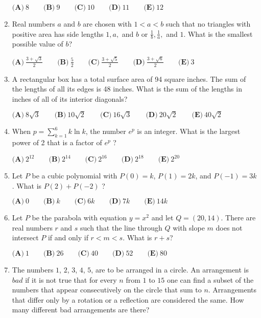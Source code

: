 \documentclass{article}
\begin{document}
\begin{enumerate}[label=\arabic*., itemsep=0.5em]
$ \textbf{(A)}\ 8\qquad\textbf{(B)}\ 9\qquad\textbf{(C)}\ 10\qquad\textbf{(D)}\ 11\qquad\textbf{(E)}\ 12 $\par \vspace{0.5em}\item Real numbers $a$ and $b$ are chosen with $1<a<b$ such that no triangles with positive area has side lengths $1, a,$ and $b$ or $\tfrac{1}{b}, \tfrac{1}{a},$ and $1$. What is the smallest possible value of $b$?

$ \textbf{(A)}\ \frac{3+\sqrt{3}}{2}\qquad\textbf{(B)}\ \frac{5}{2}\qquad\textbf{(C)}\ \frac{3+\sqrt{5}}{2}\qquad\textbf{(D)}\ \frac{3+\sqrt{6}}{2}\qquad\textbf{(E)}\ 3 $\par \vspace{0.5em}\item A rectangular box has a total surface area of 94 square inches. The sum of the lengths of all its edges is 48 inches. What is the sum of the lengths in inches of all of its interior diagonals?

$ \textbf{(A)}\ 8\sqrt{3}\qquad\textbf{(B)}\ 10\sqrt{2}\qquad\textbf{(C)}\ 16\sqrt{3}\qquad\textbf{(D)}\ 20\sqrt{2}\qquad\textbf{(E)}\ 40\sqrt{2} $\par \vspace{0.5em}\item When $p = \sum\limits_{k=1}^{6} k \ln{k}$, the number $e^p$ is an integer.  What is the largest power of 2 that is a factor of $e^p$ ?

$ \textbf{(A)}\ 2^{12}\qquad\textbf{(B)}\ 2^{14}\qquad\textbf{(C)}\ 2^{16}\qquad\textbf{(D)}\ 2^{18}\qquad\textbf{(E)}\ 2^{20} $\par \vspace{0.5em}\item Let $P$ be a cubic polynomial with $P(0) = k$, $P(1) = 2k$, and $P(-1) = 3k$.  What is $P(2) + P(-2)$ ?

$ \textbf{(A)}\ 0\qquad\textbf{(B)}\ k\qquad\textbf{(C)}\ 6k\qquad\textbf{(D)}\ 7k\qquad\textbf{(E)}\ 14k $\par \vspace{0.5em}\item Let $P$ be the parabola with equation $y=x^2$ and let $Q = (20, 14)$. There are real numbers $r$ and $s$ such that the line through $Q$ with slope $m$ does not intersect $P$ if and only if $r < m < s$. What is $r + s$?

$ \textbf{(A)}\ 1\qquad\textbf{(B)}\ 26\qquad\textbf{(C)}\ 40\qquad\textbf{(D)}\ 52\qquad\textbf{(E)}\ 80 $\par \vspace{0.5em}\item The numbers $1$, $2$, $3$, $4$, $5$, are to be arranged in a circle.  An arrangement is $\textit{bad}$ if it is not true that for every $n$ from $1$ to $15$ one can find a subset of the numbers that appear consecutively on the circle that sum to $n$.  Arrangements that differ only by a rotation or a reflection are considered the same.  How many different bad arrangements are there?


\end{enumerate}
\end{document}
